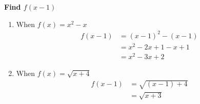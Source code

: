 \documentclass[crop=false,fleqn]{standalone}
\begin{document}
    \textbf{Find $f(x-1)$}

    \begin{enumerate}
        \item When $f(x) = x^2 - x$
        \begin{align*}
            f(x-1) &= (x-1)^2 - (x-1)\\
                &= x^2 - 2x + 1 - x + 1\\
                &= x^2 - 3x + 2
        \end{align*}

        \item When $f(x) = \sqrt{x + 4}$
        \begin{align*}
            f(x-1) &= \sqrt{(x-1) + 4}\\
                &=\sqrt{x + 3}
        \end{align*}
    \end{enumerate}
\end{document}
